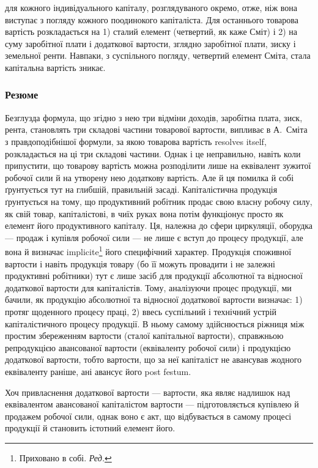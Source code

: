 \parcont{}  %
для кожного індивідуального капіталу, розглядуваного окремо, отже, ніж
вона виступає з погляду кожного поодинокого капіталіста. Для останнього
товарова вартість розкладається на 1) сталий елемент (четвертий,
як каже Сміт) і 2) на суму заробітної плати і додаткової вартости, зглядно
заробітної плати, зиску і земельної ренти. Навпаки, з суспільного погляду,
четвертий елемент Сміта, стала капітальна вартість зникає.

\subsubsection{Резюме}

Безглузда формула, що згідно з нею три відміни доходів, заробітна
плата, зиск, рента, становлять три складові частини товарової вартости,
випливає в А.~Сміта з правдоподібнішої формули, за якою товарова
вартість resolves itself, розкладається на ці три складові частини. Однак
і це неправильно, навіть коли припустити, що товарову вартість можна
розподілити лише на еквівалент зужитої робочої сили й на утворену
нею додаткову вартість. Але й ця помилка й собі ґрунтується тут на
глибшій, правильній засаді. Капіталістична продукція ґрунтується на тому,
що продуктивний робітник продає свою власну робочу силу, як свій
товар, капіталістові, в чиїх руках вона потім функціонує просто як елемент
його продуктивного капіталу. Ця, належна до сфери циркуляції,
оборудка — продаж і купівля робочої сили — не лише є вступ до процесу
продукції, але вона й визначає implicite\footnote*{
Приховано в собі. \emph{Ред.}
} його специфічний характер.
Продукція споживної вартости і навіть продукція товару (бо її можуть
провадити і не залежні продуктивні робітники) тут є лише засіб для продукції
абсолютної та відносної додаткової вартости для капіталістів. Тому, аналізуючи
процес продукції, ми бачили, як продукцію абсолютної та відносної
додаткової вартости визначає: 1) протяг щоденного процесу праці,
2) ввесь суспільний і технічний устрій капіталістичного процесу продукції.
В ньому самому здійснюється ріжниця між простим збереженням вартости
(сталої капітальної вартости), справжньою репродукцією авансованої вартости
(еквіваленту робочої сили) і продукцією додаткової вартости, тобто
вартости, що за неї капіталіст не авансував жодного еквіваленту раніше,
ані авансує його post festum.

Хоч привласнення додаткової вартости — вартости, яка являє надлишок
над еквівалентом авансованої капіталістом вартости — підготовляється
купівлею й продажем робочої сили, однак воно є акт, що відбувається
в самому процесі продукції й становить істотний елемент його.

